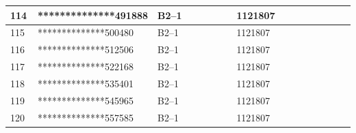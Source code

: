 \documentclass[UTF8,10pt,a4paper,fontset=fandol]{ctexart}
\newcommand{\fieldvalue}[1]{#1}
\begin{document}
\begin{center}
\begin{tabular}{|p{0.08\linewidth}|p{0.30\linewidth}|p{0.25\linewidth}|p{0.22\linewidth}|p{0.15\linewidth}|}
\fieldvalue{114}
&
\fieldvalue{**************491888}
&
\fieldvalue{B2--1}
&
\fieldvalue{1121807}
& \\ \hline
\fieldvalue{115}
&
\fieldvalue{**************500480}
&
\fieldvalue{B2--1}
&
\fieldvalue{1121807}
& \\ \hline
\fieldvalue{116}
&
\fieldvalue{**************512506}
&
\fieldvalue{B2--1}
&
\fieldvalue{1121807}
& \\ \hline
\fieldvalue{117}
&
\fieldvalue{**************522168}
&
\fieldvalue{B2--1}
&
\fieldvalue{1121807}
& \\ \hline
\fieldvalue{118}
&
\fieldvalue{**************535401}
&
\fieldvalue{B2--1}
&
\fieldvalue{1121807}
& \\ \hline
\fieldvalue{119}
&
\fieldvalue{**************545965}
&
\fieldvalue{B2--1}
&
\fieldvalue{1121807}
& \\ \hline
\fieldvalue{120}
&
\fieldvalue{**************557585}
&
\fieldvalue{B2--1}
&
\fieldvalue{1121807}
& \\ \hline

\end{tabular}
\end{center}
\end{document}
